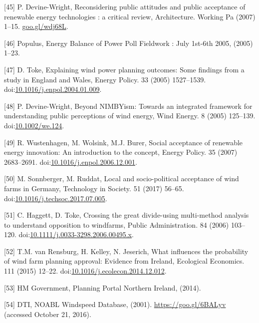 \documentclass[a4paper,]{article}
\theoremstyle{definition}
\theoremstyle{definition}
\theoremstyle{definition}
\theoremstyle{remark}
\begin{document}
\hypertarget{ref-Devine-Wright2007}{}
{[}45{]} P. Devine-Wright, Reconsidering public attitudes and public
acceptance of renewable energy technologies : a critical review,
Architecture. Working Pa (2007) 1--15. \url{goo.gl/wdj68L}.

\hypertarget{ref-Populus2005}{}
{[}46{]} Populus, Energy Balance of Power Poll Fieldwork : July 1st-6th
2005, (2005) 1--23.

\hypertarget{ref-Toke2005}{}
{[}47{]} D. Toke, Explaining wind power planning outcomes: Some findings
from a study in England and Wales, Energy Policy. 33 (2005) 1527--1539.
doi:\href{https://doi.org/10.1016/j.enpol.2004.01.009}{10.1016/j.enpol.2004.01.009}.

\hypertarget{ref-Devine-Wright2005a}{}
{[}48{]} P. Devine-Wright, Beyond NIMBYism: Towards an integrated
framework for understanding public perceptions of wind energy, Wind
Energy. 8 (2005) 125--139.
doi:\href{https://doi.org/10.1002/we.124}{10.1002/we.124}.

\hypertarget{ref-Wustenhagen2007}{}
{[}49{]} R. Wustenhagen, M. Wolsink, M.J. Burer, Social acceptance of
renewable energy innovation: An introduction to the concept, Energy
Policy. 35 (2007) 2683--2691.
doi:\href{https://doi.org/10.1016/j.enpol.2006.12.001}{10.1016/j.enpol.2006.12.001}.

\hypertarget{ref-Sonnberger2017}{}
{[}50{]} M. Sonnberger, M. Ruddat, Local and socio-political acceptance
of wind farms in Germany, Technology in Society. 51 (2017) 56--65.
doi:\href{https://doi.org/10.1016/j.techsoc.2017.07.005}{10.1016/j.techsoc.2017.07.005}.

\hypertarget{ref-Haggett2006}{}
{[}51{]} C. Haggett, D. Toke, Crossing the great divide-using
multi-method analysis to understand opposition to windfarms, Public
Administration. 84 (2006) 103--120.
doi:\href{https://doi.org/10.1111/j.0033-3298.2006.00495.x}{10.1111/j.0033-3298.2006.00495.x}.

\hypertarget{ref-VanRensburg20}{}
{[}52{]} T.M. van Rensburg, H. Kelley, N. Jeserich, What influences the
probability of wind farm planning approval: Evidence from Ireland,
Ecological Economics. 111 (2015) 12--22.
doi:\href{https://doi.org/10.1016/j.ecolecon.2014.12.012}{10.1016/j.ecolecon.2014.12.012}.

\hypertarget{ref-HMGovernment2014}{}
{[}53{]} HM Government, Planning Portal Northern Ireland, (2014).

\hypertarget{ref-DTI2001}{}
{[}54{]} DTI, NOABL Windspeed Database, (2001).
\url{https://goo.gl/6BALyv} (accessed October 21, 2016).
\end{document}
